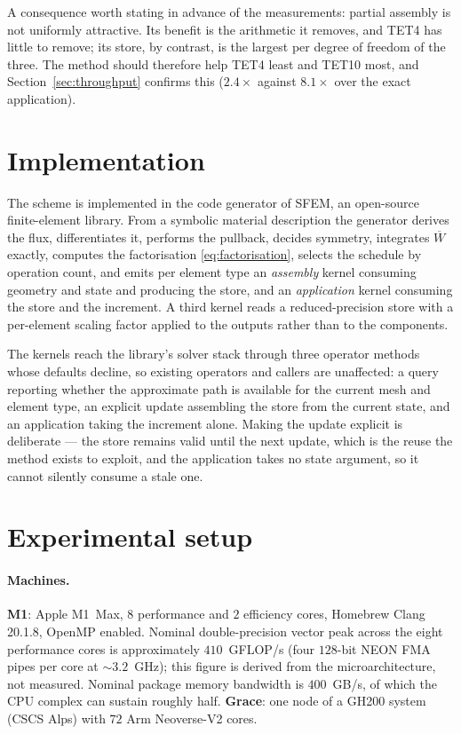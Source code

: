 \documentclass[11pt]{article}
\newcommand{\Wbar}{\overline{W}}
\begin{document}
A consequence worth stating in advance of the measurements: partial assembly is
not uniformly attractive.  Its benefit is the arithmetic it removes, and TET4
has little to remove; its store, by contrast, is the largest per degree of
freedom of the three.  The method should therefore help TET4 least and TET10
most, and Section~\ref{sec:throughput} confirms this ($2.4\times$ against
$8.1\times$ over the exact application).

\section{Implementation}

The scheme is implemented in the code generator of SFEM, an open-source
finite-element library.  From a symbolic material description the generator
derives the flux, differentiates it, performs the pullback, decides symmetry,
integrates $\Wbar$ exactly, computes the factorisation \eqref{eq:factorisation},
selects the schedule by operation count, and emits per element type an
\emph{assembly} kernel consuming geometry and state and producing the store, and
an \emph{application} kernel consuming the store and the increment.  A third
kernel reads a reduced-precision store with a per-element scaling factor applied
to the outputs rather than to the components.

The kernels reach the library's solver stack through three operator methods
whose defaults decline, so existing operators and callers are unaffected: a
query reporting whether the approximate path is available for the current mesh
and element type, an explicit update assembling the store from the current state,
and an application taking the increment alone.  Making the update explicit is
deliberate --- the store remains valid until the next update, which is the reuse
the method exists to exploit, and the application takes no state argument, so it
cannot silently consume a stale one.

\section{Experimental setup}
\label{sec:setup}

\paragraph{Machines.}  \textbf{M1}: Apple M1~Max, $8$ performance and $2$
efficiency cores, Homebrew Clang 20.1.8, OpenMP enabled.  Nominal
double-precision vector peak across the eight performance cores is
approximately $410$~GFLOP/s (four $128$-bit NEON FMA pipes per core at
$\sim$$3.2$~GHz); this figure is derived from the microarchitecture, not
measured.  Nominal package memory bandwidth is $400$~GB/s, of which the CPU
complex can sustain roughly half.  \textbf{Grace}: one node of a GH200 system
(CSCS Alps) with $72$ Arm Neoverse-V2 cores.
\end{document}
